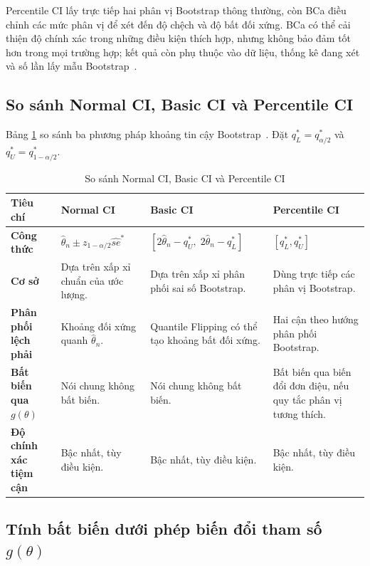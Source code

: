 \documentclass[12pt,a4paper]{article}
\theoremstyle{definition}
\numberwithin{equation}{section}
\begin{document}
Percentile CI lấy trực tiếp hai phân vị Bootstrap thông thường, còn BCa
điều chỉnh các mức phân vị để xét đến độ chệch và độ bất đối xứng.
BCa có thể cải thiện độ chính xác trong những điều kiện thích hợp, nhưng
không bảo đảm tốt hơn trong mọi trường hợp; kết quả còn phụ thuộc vào dữ
liệu, thống kê đang xét và số lần lấy mẫu Bootstrap~\cite{efron1993,davison1997}.
\subsection{So sánh Normal CI, Basic CI và Percentile CI}

Bảng \ref{tab:trio_comparison} so sánh ba phương pháp khoảng tin cậy Bootstrap~\cite{buithuytrang2026,rizzo2019,efron1993,davison1997,justus2024}. Đặt $q_L^*=q_{\alpha/2}^*$ và $q_U^*=q_{1-\alpha/2}^*$.

\begin{table}[htbp]
	\centering
	\small
	\renewcommand{\arraystretch}{1.4}
	\setlength{\tabcolsep}{4pt}
	\caption{So sánh Normal CI, Basic CI và Percentile CI}
	\label{tab:trio_comparison}
	\begin{tabular}{>{\raggedright\arraybackslash}p{2.5cm}>{\raggedright\arraybackslash}p{4.2cm}>{\raggedright\arraybackslash}p{4.2cm}>{\raggedright\arraybackslash}p{4.2cm}}
		\toprule
		\textbf{Tiêu chí} & \textbf{Normal CI} & \textbf{Basic CI} & \textbf{Percentile CI} \\
		\midrule
		\textbf{Công thức} & $\hat{\theta}_n \pm z_{1-\alpha/2}\widehat{se}^*$  & $[2\hat{\theta}_n-q_U^*,\;2\hat{\theta}_n-q_L^*]$  & $[q_L^*,q_U^*]$  \\
		\textbf{Cơ sở} & Dựa trên xấp xỉ chuẩn của ước lượng. & Dựa trên xấp xỉ phân phối sai số Bootstrap. & Dùng trực tiếp các phân vị Bootstrap. \\
		\textbf{Phân phối lệch phải} & Khoảng đối xứng quanh $\hat{\theta}_n$. & Quantile Flipping có thể tạo khoảng bất đối xứng. & Hai cận theo hướng phân phối Bootstrap. \\
		\textbf{Bất biến qua $g(\theta)$} & Nói chung không bất biến. & Nói chung không bất biến. & Bất biến qua biến đổi đơn điệu, nếu quy tắc phân vị tương thích. \\
		\textbf{Độ chính xác tiệm cận} & Bậc nhất, tùy điều kiện. & Bậc nhất, tùy điều kiện. & Bậc nhất, tùy điều kiện. \\
		\bottomrule
	\end{tabular}
\end{table}

\subsection{Tính bất biến dưới phép biến đổi tham số $g(\theta)$}
\end{document}
